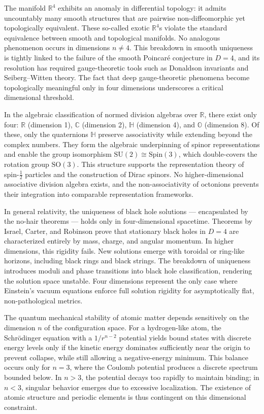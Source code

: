 The manifold $\mathbb{R}^4$ exhibits an anomaly in differential topology: it admits uncountably many smooth structures that are pairwise non-diffeomorphic yet topologically equivalent. These so-called exotic $\mathbb{R}^4$s violate the standard equivalence between smooth and topological manifolds. No analogous phenomenon occurs in dimensions $n \ne 4$. This breakdown in smooth uniqueness is tightly linked to the failure of the smooth Poincaré conjecture in $D=4$, and its resolution has required gauge-theoretic tools such as Donaldson invariants and Seiberg–Witten theory. The fact that deep gauge-theoretic phenomena become topologically meaningful only in four dimensions underscores a critical dimensional threshold.

In the algebraic classification of normed division algebras over $\mathbb{R}$, there exist only four: $\mathbb{R}$ (dimension 1), $\mathbb{C}$ (dimension 2), $\mathbb{H}$ (dimension 4), and $\mathbb{O}$ (dimension 8). Of these, only the quaternions $\mathbb{H}$ preserve associativity while extending beyond the complex numbers. They form the algebraic underpinning of spinor representations and enable the group isomorphism $\mathrm{SU}(2) \cong \mathrm{Spin}(3)$, which double-covers the rotation group $\mathrm{SO}(3)$. This structure supports the representation theory of spin-$\tfrac{1}{2}$ particles and the construction of Dirac spinors. No higher-dimensional associative division algebra exists, and the non-associativity of octonions prevents their integration into comparable representation frameworks.

In general relativity, the uniqueness of black hole solutions — encapsulated by the no-hair theorems — holds only in four-dimensional spacetime. Theorems by Israel, Carter, and Robinson prove that stationary black holes in $D=4$ are characterized entirely by mass, charge, and angular momentum. In higher dimensions, this rigidity fails. New solutions emerge with toroidal or ring-like horizons, including black rings and black strings. The breakdown of uniqueness introduces moduli and phase transitions into black hole classification, rendering the solution space unstable. Four dimensions represent the only case where Einstein’s vacuum equations enforce full solution rigidity for asymptotically flat, non-pathological metrics.

The quantum mechanical stability of atomic matter depends sensitively on the dimension $n$ of the configuration space. For a hydrogen-like atom, the Schrödinger equation with a $1/r^{n-2}$ potential yields bound states with discrete energy levels only if the kinetic energy dominates sufficiently near the origin to prevent collapse, while still allowing a negative-energy minimum. This balance occurs only for $n=3$, where the Coulomb potential produces a discrete spectrum bounded below. In $n>3$, the potential decays too rapidly to maintain binding; in $n<3$, singular behavior emerges due to excessive localization. The existence of atomic structure and periodic elements is thus contingent on this dimensional constraint.

